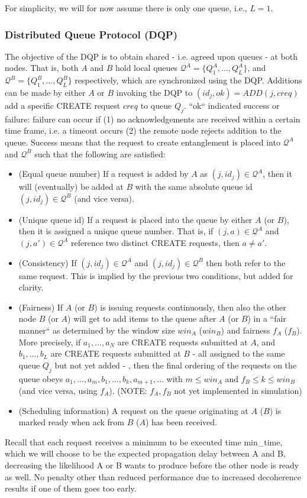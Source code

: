 \documentclass{article}
\begin{document}
For simplicity, we will for now assume there is only one queue, i.e., $L=1$.

\subsubsection{Distributed Queue Protocol (DQP)}
The objective of the DQP is to obtain shared - i.e. agreed upon queues - at both nodes. That is, both $A$ and $B$ hold local queues
$\mathcal{Q}^A = \{Q_1^A,\ldots,Q_L^A\}$, and $\mathcal{Q}^B = \{Q_1^B,\ldots,Q_L^B\}$ respectively, which are
synchronized using the DQP. Additions can be made by either $A$ or $B$ invoking the DQP to $(id_j, ok) = ADD(j, creq)$ add a specific CREATE request $creq$ to queue
$Q_j$. ``ok`` indicated success or failure: failure can occur if (1) no acknowledgements are received within a certain time frame, i.e. a timeout occurs
(2) the remote node rejects addition to the queue. Success means that the request
to create entanglement is placed into $\mathcal{Q}^A$ and $\mathcal{Q}^B$ such that the following are satisfied:
\begin{itemize}
\item (Equal queue number) If a request is added by $A$ as $(j,id_j) \in \mathcal{Q}^A$, then it will (eventually) be added at $B$ with the same absolute queue id
$(j,id_j) \in \mathcal{Q}^B$ (and vice versa).
\item (Unique queue id) If a request is placed into the queue by either $A$ (or $B$),
then it is assigned a unique queue number. That is,
if $(j,a) \in \mathcal{Q}^A$ and $(j,a') \in \mathcal{Q}^A$ reference two distinct CREATE requests, then $a \neq a'$.
\item (Consistency) If $(j,id_j) \in \mathcal{Q}^A$ and $(j,id_j) \in \mathcal{Q}^B$ then both refer to the same request. This is implied by the previous two
conditions, but added for clarity.
\item (Fairness) If $A$ (or $B$) is issuing requests continuously, then also the other node $B$ (or $A$) will get to add items to the queue after $A$ (or $B$)
in a ``fair manner`` as determined by the window size $win_A$ ($win_B$) and fairness $f_A$ ($f_B$).
More precisely, if $a_1,\ldots,a_N$ are CREATE requests submitted at $A$, and $b_1,\ldots,b_L$ are CREATE requests submitted
at $B$ - all assigned to the same queue $Q_j$ but not yet added - , then the final ordering of the requests on the queue obeys
$a_1,\ldots,a_m,b_1,\ldots,b_k,a_{m+1},\ldots$ with $m \leq win_A$ and $f_B \leq k \leq win_B$ (and vice versa, using $f_A$). (NOTE: $f_A,f_B$ not yet implemented in simulation)
\item (Scheduling information) A request on the queue originating at $A$ ($B$) is marked ready when ack from $B$ ($A$) has been received.
\end{itemize}
Recall that each request receives a minimum to be executed time min\_time, which we will choose to be the expected propagation delay between A and B, decreasing the likelihood A or B wants to produce before the other node is ready as well. No penalty other than reduced performance due to increased decoherence results if one of them goes too early.
\end{document}
